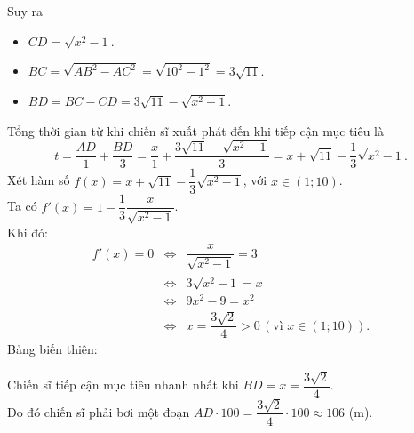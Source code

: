 \begin{bt}
{		Suy  ra
		\begin{itemize}
			\item  $CD=\sqrt{x^2-1}$.
			 \item $BC=\sqrt{AB^2-AC^2}=\sqrt{{10}^2-1^2}=3\sqrt{11}$.
			\item  $BD=BC-CD=3\sqrt{11}-\sqrt{x^2-1}$.
		\end{itemize}
		Tổng thời gian từ khi chiến sĩ xuất phát đến khi tiếp cận mục  tiêu là \[t=\dfrac{AD}{1}+\dfrac{BD}{3}=\dfrac{x}{1}+\dfrac{3\sqrt{11}-\sqrt{x^2-1}}{3}=x+\sqrt{11}-\dfrac{1}{3}\sqrt{x^2-1}.\]
		Xét hàm số $f(x)=x+\sqrt{11}-\dfrac{1}{3}\sqrt{x^2-1}$, với $x\in  (1;10)$.\\
		Ta có  $f'(x)=1-\dfrac{1}{3}\dfrac{x}{\sqrt{x^2-1}}$.\\Khi đó:
		\allowdisplaybreaks 
		\begin{eqnarray*}
			f'(x)=0&\Leftrightarrow& \dfrac{x}{\sqrt{x^2-1}}=3\\ 
			&\Leftrightarrow& 3\sqrt{x^2-1}=x  \\
			&\Leftrightarrow& 9x^2-9=x^2 \\ 
			&\Leftrightarrow&  x=\dfrac{3\sqrt{2}}{4} > 0 \,(\text{vì } x\in (1;10)).
		\end{eqnarray*}
		Bảng biến thiên: 
		\begin{center}
		\end{center}
		Chiến sĩ  tiếp cận mục tiêu nhanh nhất khi $BD=x=\dfrac{3\sqrt{2}}{4}$.\\
		 Do đó chiến sĩ phải bơi một đoạn $AD\cdot 100=\dfrac{3\sqrt{2}}{4}\cdot 100\approx 106$ (m).
	} 
\end{bt}

